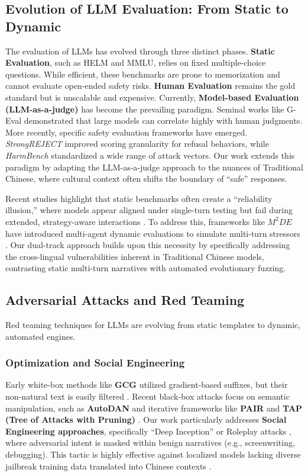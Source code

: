 \documentclass[conference]{IEEEtran}
\begin{document}
\subsection{Evolution of LLM Evaluation: From Static to Dynamic}
The evaluation of LLMs has evolved through three distinct phases. 
\textbf{Static Evaluation}, such as HELM and MMLU, relies on fixed multiple-choice questions. While efficient, these benchmarks are prone to memorization and cannot evaluate open-ended safety risks.
\textbf{Human Evaluation} remains the gold standard but is unscalable and expensive.
Currently, \textbf{Model-based Evaluation (LLM-as-a-judge)} has become the prevailing paradigm. 
Seminal works like G-Eval \cite{liu2023geval} demonstrated that large models can correlate highly with human judgments. 
More recently, specific safety evaluation frameworks have emerged. \textit{StrongREJECT} \cite{souly2024strongreject} improved scoring granularity for refusal behaviors, while \textit{HarmBench} \cite{mazeika2024harmbench} standardized a wide range of attack vectors. 
Our work extends this paradigm by adapting the LLM-as-a-judge approach to the nuances of Traditional Chinese, where cultural context often shifts the boundary of ``safe'' responses.

Recent studies highlight that static benchmarks often create a ``reliability illusion,'' where models appear aligned under single-turn testing but fail during extended, strategy-aware interactions \cite{xiao2026m2de}. To address this, frameworks like $M^2DE$ have introduced multi-agent dynamic evaluations to simulate multi-turn stressors \cite{xiao2026m2de}. Our dual-track approach builds upon this necessity by specifically addressing the cross-lingual vulnerabilities inherent in Traditional Chinese models, contrasting static multi-turn narratives with automated evolutionary fuzzing.

\subsection{Adversarial Attacks and Red Teaming}
Red teaming techniques for LLMs are evolving from static templates to dynamic, automated engines.

\subsubsection{Optimization and Social Engineering}
Early white-box methods like \textbf{GCG} \cite{zou2023universal} utilized gradient-based suffixes, but their non-natural text is easily filtered \cite{shao2026promptfuzz}. Recent black-box attacks focus on semantic manipulation, such as \textbf{AutoDAN} \cite{liu2023autodan} and iterative frameworks like \textbf{PAIR} \cite{chao2023jailbreaking} and \textbf{TAP (Tree of Attacks with Pruning)} \cite{mehrotra2024tap}. Our work particularly addresses \textbf{Social Engineering approaches}, specifically ``Deep Inception'' or Roleplay attacks \cite{li2023deepinception}, where adversarial intent is masked within benign narratives (e.g., screenwriting, debugging). This tactic is highly effective against localized models lacking diverse jailbreak training data translated into Chinese contexts \cite{taide2024official}.
\end{document}
